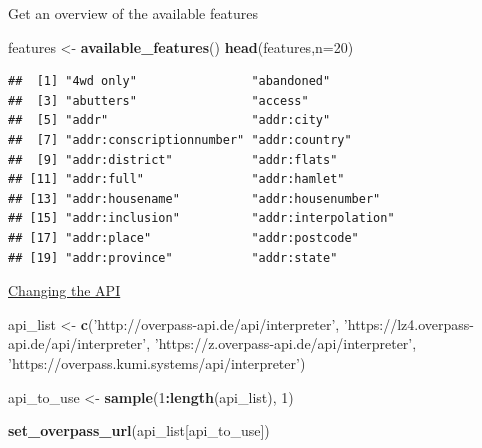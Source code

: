 \documentclass[ignorenonframetext,]{beamer}
\newenvironment{Shaded}{\begin{snugshade}}{\end{snugshade}}
\newcommand{\DataTypeTok}[1]{\textcolor[rgb]{0.13,0.29,0.53}{#1}}
\newcommand{\DecValTok}[1]{\textcolor[rgb]{0.00,0.00,0.81}{#1}}
\newcommand{\KeywordTok}[1]{\textcolor[rgb]{0.13,0.29,0.53}{\textbf{#1}}}
\newcommand{\NormalTok}[1]{#1}
\newcommand{\OperatorTok}[1]{\textcolor[rgb]{0.81,0.36,0.00}{\textbf{#1}}}
\newcommand{\StringTok}[1]{\textcolor[rgb]{0.31,0.60,0.02}{#1}}
\begin{document}
\begin{frame}[fragile]{Get an overview of the available features}
\protect\hypertarget{get-an-overview-of-the-available-features}{}

\begin{Shaded}
\begin{Highlighting}[]
\NormalTok{features <-}\StringTok{ }\KeywordTok{available_features}\NormalTok{()}
\KeywordTok{head}\NormalTok{(features,}\DataTypeTok{n=}\DecValTok{20}\NormalTok{)}
\end{Highlighting}
\end{Shaded}

\begin{verbatim}
##  [1] "4wd only"                "abandoned"              
##  [3] "abutters"                "access"                 
##  [5] "addr"                    "addr:city"              
##  [7] "addr:conscriptionnumber" "addr:country"           
##  [9] "addr:district"           "addr:flats"             
## [11] "addr:full"               "addr:hamlet"            
## [13] "addr:housename"          "addr:housenumber"       
## [15] "addr:inclusion"          "addr:interpolation"     
## [17] "addr:place"              "addr:postcode"          
## [19] "addr:province"           "addr:state"
\end{verbatim}

\end{frame}

\begin{frame}[fragile]{\href{https://github.com/ropensci/osmdata/issues/126}{Changing
the API}}
\protect\hypertarget{changing-the-api}{}

\begin{Shaded}
\begin{Highlighting}[]
\NormalTok{api_list <-}\StringTok{ }\KeywordTok{c}\NormalTok{(}\StringTok{'http://overpass-api.de/api/interpreter'}\NormalTok{,}
              \StringTok{'https://lz4.overpass-api.de/api/interpreter'}\NormalTok{,}
              \StringTok{'https://z.overpass-api.de/api/interpreter'}\NormalTok{,}
              \StringTok{'https://overpass.kumi.systems/api/interpreter'}\NormalTok{)}

\NormalTok{api_to_use <-}\StringTok{ }\KeywordTok{sample}\NormalTok{(}\DecValTok{1}\OperatorTok{:}\KeywordTok{length}\NormalTok{(api_list), }\DecValTok{1}\NormalTok{)}

\KeywordTok{set_overpass_url}\NormalTok{(api_list[api_to_use]) }
\end{Highlighting}
\end{Shaded}

\end{frame}
\end{document}
